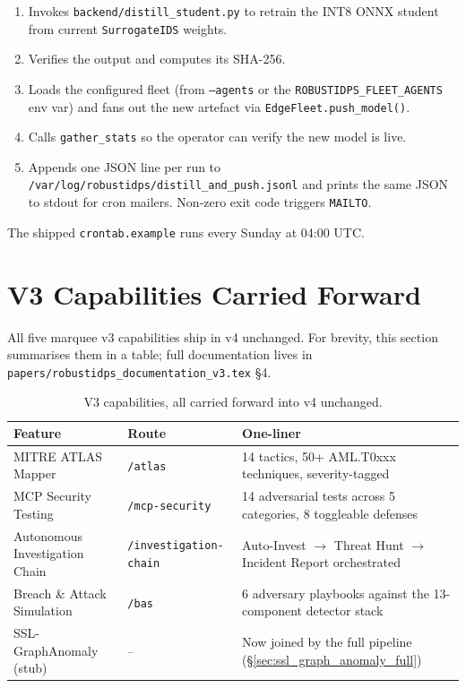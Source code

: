 \documentclass[11pt,a4paper]{article}
\begin{document}
\begin{enumerate}[nosep,leftmargin=*]
  \item Invokes \texttt{backend/distill\_student.py} to retrain the
        INT8 ONNX student from current \texttt{SurrogateIDS} weights.
  \item Verifies the output and computes its SHA-256.
  \item Loads the configured fleet (from \texttt{--agents} or the
        \texttt{ROBUSTIDPS\_FLEET\_AGENTS} env var) and fans out the
        new artefact via \texttt{EdgeFleet.push\_model()}.
  \item Calls \texttt{gather\_stats} so the operator can verify the
        new model is live.
  \item Appends one JSON line per run to
        \texttt{/var/log/robustidps/distill\_and\_push.jsonl} and
        prints the same JSON to stdout for cron mailers.  Non-zero
        exit code triggers \texttt{MAILTO}.
\end{enumerate}

The shipped \texttt{crontab.example} runs every Sunday at 04:00 UTC.

\section{V3 Capabilities Carried Forward}
\label{sec:v3_carryforward}

All five marquee v3 capabilities ship in v4 unchanged.  For brevity,
this section summarises them in a table; full documentation lives in
\texttt{papers/robustidps\_documentation\_v3.tex} \S4.

\begin{table}[H]
\centering
\caption{V3 capabilities, all carried forward into v4 unchanged.}
\label{tab:v3_carryforward}
\small
\begin{tabular}{@{}llp{6.5cm}@{}}
\toprule
\textbf{Feature} & \textbf{Route} & \textbf{One-liner} \\
\midrule
MITRE ATLAS Mapper            & \texttt{/atlas}                & 14 tactics, 50+ AML.T0xxx techniques, severity-tagged \\
MCP Security Testing          & \texttt{/mcp-security}         & 14 adversarial tests across 5 categories, 8 toggleable defenses \\
Autonomous Investigation Chain& \texttt{/investigation-chain}  & Auto-Invest $\to$ Threat Hunt $\to$ Incident Report orchestrated \\
Breach \& Attack Simulation   & \texttt{/bas}                  & 6 adversary playbooks against the 13-component detector stack \\
SSL-GraphAnomaly (stub)       & --                             & Now joined by the full pipeline (\S\ref{sec:ssl_graph_anomaly_full}) \\
\bottomrule
\end{tabular}
\end{table}
\end{document}
